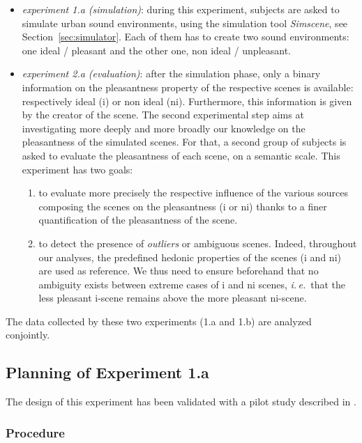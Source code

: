 \documentclass[12pt]{elsarticle}
\newcommand{\ie}{\emph{i.\,e.}}
\begin{document}
\begin{itemize}
\item \emph{experiment 1.a (simulation)}: during this experiment, subjects are asked to simulate urban sound environments, using the simulation tool \emph{Simscene}, see Section~\ref{sec:simulator}. Each of them has to create two sound environments: one ideal / pleasant and the other one, non ideal / unpleasant.
\item \emph{experiment 2.a (evaluation)}: after the simulation phase, only a binary information on the pleasantness property of the respective scenes is available: respectively ideal (i) or non ideal (ni). Furthermore, this information is given by the creator of the scene. The second experimental step aims at investigating more deeply and more broadly our knowledge on the pleasantness of the simulated scenes. For that, a second group of subjects is asked to evaluate the pleasantness of each scene, on a semantic scale. This experiment has two goals:
\begin{enumerate}
\item to evaluate more precisely the respective influence of the various sources composing the scenes on the pleasantness  (i or ni) thanks to a finer quantification of the pleasantness of the scene.
\item to detect the presence of \emph{outliers} or ambiguous scenes. Indeed, throughout our analyses, the predefined hedonic properties of the scenes (i and ni) are used as reference. We thus need to ensure beforehand that no ambiguity exists between extreme cases of i and ni scenes, \ie~that the less pleasant i-scene remains above the more pleasant ni-scene.
\end{enumerate}
\end{itemize}


The data collected by these two experiments (1.a and 1.b) are analyzed conjointly.

\subsection{Planning of Experiment 1.a}
\label{sec:xp1a_plan}

The design of this experiment has been validated with a pilot study described in \cite{lafay2014new}.

\subsubsection*{Procedure}
\end{document}
